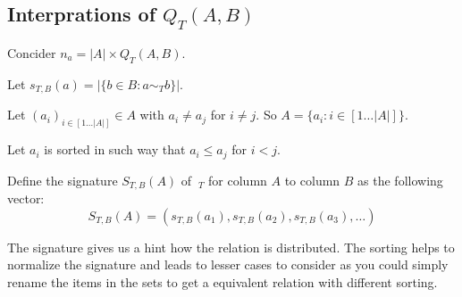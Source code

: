 \subsection{Interprations of $Q_T(A,B)$}
Concider $n_a = |A| \times Q_T(A,B)$. 

\begin{definition}[Signature $S_{T,B}(A)$]
  Let $s_{T,B}(a) = |\{ b \in B : a \sim_T b \}|$.

  Let $(a_i)_{i \in [1 \ldots |A|]} \in A$ with $a_i \neq a_j$ for $i \neq j$.
  So $A = \{ a_i : i \in [1 \ldots |A|] \}$.

  Let $a_i$ is sorted in such way that $a_i \leq a_j$ for $i < j$.

  Define the signature $S_{T,B}(A)$ of $~_T$ for column $A$ to column $B$ as the following vector:
  \begin{equation}
    S_{T,B}(A) = (s_{T,B}(a_1), s_{T,B}(a_2), s_{T,B}(a_3), \ldots )
  \end{equation}
\end{definition}

The signature gives us a hint how the relation is distributed.
The sorting helps to normalize the signature and leads to lesser cases to consider as you could simply rename the items in the sets to get a equivalent relation with different sorting.

